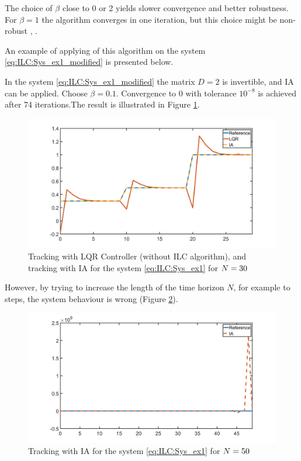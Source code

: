 The choice of $\beta$ close to 0 or 2 yields slower convergence and better robustness. For $\beta = 1$ the algorithm converges in one iteration, but this choice might be non-robust \cite[pp 149, 152-155]{ILC}, .

An example of applying of this algorithm on the system \ref{eq:ILC:Sys_ex1_modified} is presented below. 

\begin{exam}
	\label{ex:ILC:badIA}
	In the system \eqref{eq:ILC:Sys_ex1_modified} the matrix $D = 2$ is invertible, and IA can be applied.  Choose $\beta = 0.1$. Convergence to 0 with tolerance $10^{-8}$ is achieved after 74 iterations.The result is illustrated in Figure \ref{img:ILC:Ex1_IA}.
			
	\begin{figure}[t]
		\includegraphics[width=\textwidth]{fig/Ex1_IA.jpg}
		\caption{Tracking with LQR Controller (without ILC algorithm), and tracking with IA for the system \eqref{eq:ILC:Sys_ex1} for $N = 30$} 		\label{img:ILC:Ex1_IA}
	\end{figure}

	However, by trying to increase the length of the time horizon $N$, for example to {\IAbad} steps, the system behaviour is wrong  (Figure \ref{img:ILC:Ex1_IAbad}). 
		
			\begin{figure}[t]
			\centering
			\includegraphics[width=\textwidth]{fig/Ex1_IAbad.jpg}
			\caption{Tracking with IA for the system \eqref{eq:ILC:Sys_ex1} for $N = 50$}
			\label{img:ILC:Ex1_IAbad}
		\end{figure}
	

\end{exam}
